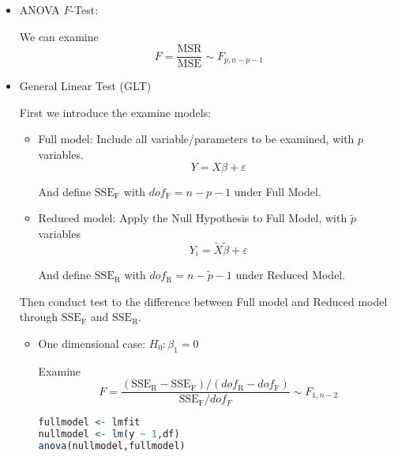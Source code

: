 \begin{itemize}[topsep=2pt,itemsep=2pt]
\item ANOVA $ F $-Test:
    
    We can examine  
    \begin{equation}
        F=\dfrac{\mathrm{MSR}}{\mathrm{MSE}}\sim F_{p,n-p-1} 
    \end{equation}
    
\item General Linear Test (GLT)
    
    First we introduce the examine models:
    \begin{itemize}[topsep=2pt,itemsep=2pt]
        \item Full model: Include all variable/parameters to be examined, with $ p $ variables.
        \begin{equation}
            Y=X\beta +\varepsilon
        \end{equation}

        And define $ \mathrm{SSE}_\mathrm{F} $ with $ dof_\mathrm{F}=n-p-1 $ under Full Model.
        \item Reduced model: Apply the Null Hypothesis to Full Model, with $ \tilde{p} $ variables
        \begin{equation}
         Y_i=\tilde{X}\tilde{\beta }+\varepsilon 
        \end{equation}
        
        And define $ \mathrm{SSE}_\mathrm{R} $ with $ dof_\mathrm{R}=n-\tilde{p}-1 $ under Reduced Model.
    \end{itemize}

    Then conduct test to the difference between Full model and Reduced model through $ \mathrm{SSE}_\mathrm{F}  $ and $ \mathrm{SSE}_\mathrm{R}  $.

    \begin{itemize}[topsep=2pt,itemsep=2pt]
        \item One dimensional case: $ H_0:\beta _1=0 $
        
        Examine
        \begin{equation}
            F=\dfrac{(\mathrm{SSE_R-SSE_F})/(dof_\mathrm{R}-dof_\mathrm{F} )}{\mathrm{SSE_F}/dof_F} \sim F_{1,n-2}
        \end{equation}
\begin{rcode}
\begin{lstlisting}[language=R]
fullmodel <- lmfit
nullmodel <- lm(y ~ 1,df)
anova(nullmodel,fullmodel)
\end{lstlisting}
\end{rcode}


\end{itemize}
\end{itemize}
